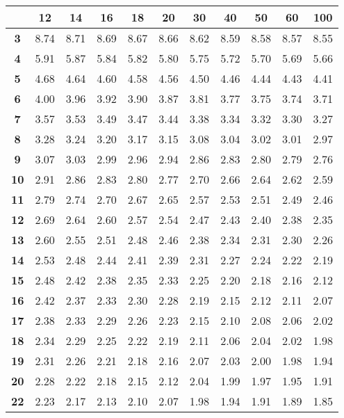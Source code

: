 \noindent\begin{tabular}{*{11}{|c}|}
    \hline
     & \textbf12 & \textbf14 & \textbf16 & \textbf18 & \textbf20 & \textbf30 & \textbf40 & \textbf50 & \textbf60 & \textbf100 \\ 
 \hline 
 \textbf{3} & 8.74 &8.71 &8.69 &8.67 &8.66 &8.62 &8.59 &8.58 &8.57 &8.55 \\
\hline 
\textbf{4} & 5.91 &5.87 &5.84 &5.82 &5.80 &5.75 &5.72 &5.70 &5.69 &5.66 \\
\hline 
\textbf{5} & 4.68 &4.64 &4.60 &4.58 &4.56 &4.50 &4.46 &4.44 &4.43 &4.41 \\
\hline 
\textbf{6} & 4.00 &3.96 &3.92 &3.90 &3.87 &3.81 &3.77 &3.75 &3.74 &3.71 \\
\hline 
\textbf{7} & 3.57 &3.53 &3.49 &3.47 &3.44 &3.38 &3.34 &3.32 &3.30 &3.27 \\
\hline 
\textbf{8} & 3.28 &3.24 &3.20 &3.17 &3.15 &3.08 &3.04 &3.02 &3.01 &2.97 \\
\hline 
\textbf{9} & 3.07 &3.03 &2.99 &2.96 &2.94 &2.86 &2.83 &2.80 &2.79 &2.76 \\
\hline 
\textbf{10} & 2.91 &2.86 &2.83 &2.80 &2.77 &2.70 &2.66 &2.64 &2.62 &2.59 \\
\hline 
\textbf{11} & 2.79 &2.74 &2.70 &2.67 &2.65 &2.57 &2.53 &2.51 &2.49 &2.46 \\
\hline 
\textbf{12} & 2.69 &2.64 &2.60 &2.57 &2.54 &2.47 &2.43 &2.40 &2.38 &2.35 \\
\hline 
\textbf{13} & 2.60 &2.55 &2.51 &2.48 &2.46 &2.38 &2.34 &2.31 &2.30 &2.26 \\
\hline 
\textbf{14} & 2.53 &2.48 &2.44 &2.41 &2.39 &2.31 &2.27 &2.24 &2.22 &2.19 \\
\hline 
\textbf{15} & 2.48 &2.42 &2.38 &2.35 &2.33 &2.25 &2.20 &2.18 &2.16 &2.12 \\
\hline 
\textbf{16} & 2.42 &2.37 &2.33 &2.30 &2.28 &2.19 &2.15 &2.12 &2.11 &2.07 \\
\hline 
\textbf{17} & 2.38 &2.33 &2.29 &2.26 &2.23 &2.15 &2.10 &2.08 &2.06 &2.02 \\
\hline 
\textbf{18} & 2.34 &2.29 &2.25 &2.22 &2.19 &2.11 &2.06 &2.04 &2.02 &1.98 \\
\hline 
\textbf{19} & 2.31 &2.26 &2.21 &2.18 &2.16 &2.07 &2.03 &2.00 &1.98 &1.94 \\
\hline 
\textbf{20} & 2.28 &2.22 &2.18 &2.15 &2.12 &2.04 &1.99 &1.97 &1.95 &1.91 \\
\hline 
\textbf{22} & 2.23 &2.17 &2.13 &2.10 &2.07 &1.98 &1.94 &1.91 &1.89 &1.85 \\

\end{tabular}
